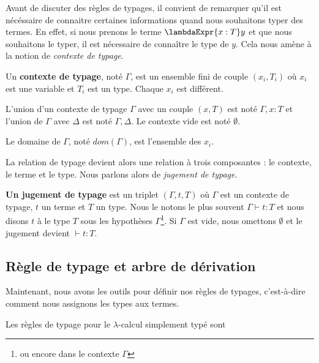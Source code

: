 Avant de discuter des règles de typages, il convient de remarquer qu'il est
nécéssaire de connaitre certaines informations quand nous souhaitons typer des
termes. En effet, si nous prenons le terme $\lambdaExpr{x : T} y$ et que nous
souhaitons le typer, il est nécessaire de connaître le type de $y$. Cela nous
amène à la notion de \textit{contexte de typage}.

\begin{definition} 
  \label{def:simply-typed-lambda-calculus-context}
  Un \textbf{contexte de typage}, noté $\Gamma$, est un ensemble fini de couple $(x_{i},
  T_{i})$ où $x_{i}$ est une variable et $T_{i}$ est un type. Chaque $x_{i}$ est différent.
  
  L'union d'un contexte de typage $\Gamma$ avec un couple $(x, T)$ est noté
  $\Gamma, x : T$ et l'union de $\Gamma$ avec $\Delta$ est noté $\Gamma, \Delta$.
  Le contexte vide est noté $\emptyset$.

  Le domaine de $\Gamma$, noté $dom(\Gamma)$, est l'ensemble des $x_{i}$.
\end{definition}

La relation de typage devient alors une relation à trois composantes : le
contexte, le terme et le type. Nous parlons alors de \textit{jugement de typage}.

\begin{definition} 
  \label{def:simply-typed-lambda-calculus-judgement}
  \textbf{Un jugement de typage} est un triplet $(\Gamma, t, T)$ où $\Gamma$ est un
  contexte de typage, $t$ un terme et $T$ un type. Nous le notons le plus
  souvent $\Gamma \vdash t : T$ et nous disons \og $t$ à le type $T$ sous les
  hypothèses $\Gamma$\footnote{ou encore dans le contexte $\Gamma$}. Si $\Gamma$
  est vide, nous omettons $\emptyset$ et le jugement devient $\vdash t : T$.
\end{definition}

\subsection*{Règle de typage et arbre de dérivation}

Maintenant, nous avons les outils pour définir nos règles de typages,
c'est-à-dire comment nous assignons les types aux termes.

\begin{definition} 
  \label{def:simply-typed-lambda-calculus-typing-rules}
  Les règles de typage pour le $\lambda$-calcul simplement typé sont
\end{definition}

